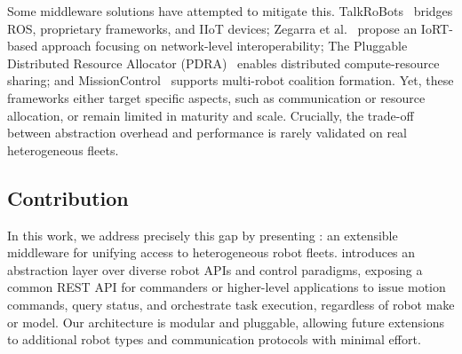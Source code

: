 \documentclass[conference]{IEEEtran}
\begin{document}
Some middleware solutions have attempted to mitigate this. 
%
TalkRoBots~\cite{ayaida2022fi} bridges ROS, proprietary frameworks, and IIoT devices; 
 Zegarra et al.~\cite{cuadroszegarra2024jsan} propose an IoRT-based approach focusing on network-level interoperability; 
 The Pluggable Distributed Resource Allocator (PDRA)~\cite{rossi2020iros} enables distributed compute-resource sharing; 
 and MissionControl~\cite{rodrigues2022jss} supports multi-robot coalition formation. 
% 
Yet,
 these frameworks either target specific aspects, 
 such as communication or resource allocation,
 or remain limited in maturity and scale. 
% 
Crucially, the trade-off between abstraction overhead 
 and performance is rarely validated on real heterogeneous fleets.

\subsection{Contribution}
In this work, 
 we address precisely this gap by presenting \approach{}:
 an extensible middleware for unifying access to heterogeneous robot fleets. 
% 
\approach{} introduces an abstraction layer over diverse robot APIs and control paradigms, 
 exposing a common REST API for commanders or higher-level applications to issue motion commands, 
 query status, and orchestrate task execution, regardless of robot make or model. 
% 
Our architecture is modular and pluggable, 
 allowing future extensions to additional robot types and communication protocols with minimal effort.
\end{document}
